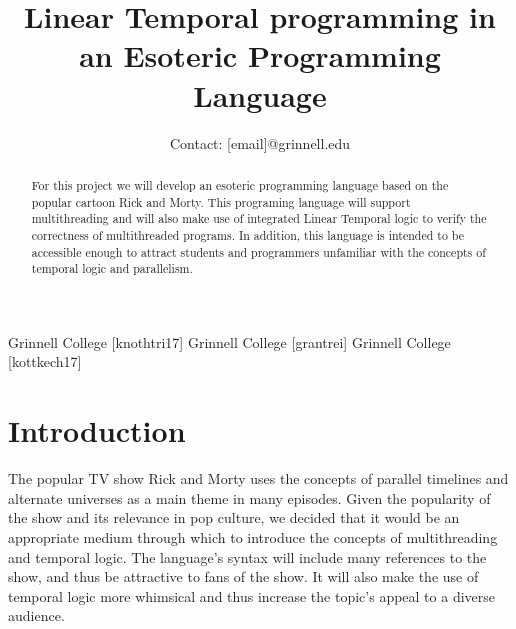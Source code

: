\documentclass[numbers]{sigplanconf}
\begin{document}
\setlength{\pdfpageheight}{\paperheight}
\setlength{\pdfpagewidth}{\paperwidth}



\titlebanner{}        %
\preprintfooter{}   %

\title{Linear Temporal programming in an Esoteric Programming Language}
\subtitle{Contact: [email]@grinnell.edu}


           {Grinnell College}
           {[knothtri17]}
           {Grinnell College}
           {[grantrei]}
           {Grinnell College}
           {[kottkech17]}

\makeatletter
\def\@copyrightspace{\relax}
\makeatother
%

\maketitle

\begin{abstract}
For this project we will develop an esoteric programming language
based on the popular cartoon Rick and Morty. This programing
language will support multithreading and will also make use of integrated Linear Temporal logic to verify the
correctness of multithreaded programs. In addition, this language
is intended to be accessible enough to attract students and
programmers unfamiliar with the concepts of temporal logic and parallelism.
\end{abstract}



\section{Introduction}
The popular TV show Rick and Morty uses the concepts of
parallel timelines and alternate universes as a main theme in many
episodes. Given the popularity of the show and its relevance in pop
culture, we decided that it would be an appropriate medium through
which to introduce the concepts of multithreading and temporal logic.
The language's syntax will include many references to the show,
and thus be attractive to fans of the show. It will also make the use of
temporal logic more whimsical and thus increase the topic's appeal to a diverse audience.
\end{document}

